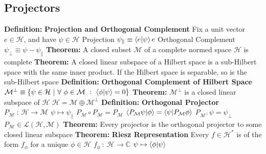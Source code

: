 \documentclass[14pt]{extarticle}
\def\Definition{{\color{blue} \textbf{Definition:} }}
\def\Theorem{{\color{red} \textbf{Theorem:} }}
\begin{document}
\begin{outline}
	\section*{Projectors}
		\1	\Definition \textbf{Projection and Orthogonal Complement}
			\2	Fix a unit vector $e \in \mathcal{H}$, and have $\psi \in \mathcal{H}$
			\2	Projection $\psi_{\parallel} \equiv \braket{e}{\psi}e$
			\2	Orthogonal Complement $\psi_{\bot} \equiv \psi - \psi_{\parallel}$
		\1	\Theorem A closed subset $\mathcal{M}$ of a complete normed space $\mathcal{H}$ is
				complete
		\1	\Theorem A closed linear subspace of a Hilbert space is a sub-Hilbert space
				with the same inner product.  If the Hilbert space is separable, so is 
				the sub-Hilbert space
		\1	\Definition \textbf{Orthogonal Complement of Hilbert Space}
			\2	$\mathcal{M}^{\bot} \equiv \{\psi \in \mathcal{H}~|~\forall~\phi \in \mathcal{M}~:~
						\braket{\phi}{\psi} = 0\}$
		\1	\Theorem $\mathcal{M}^{\bot}$ is a closed linear subspace of $\mathcal{H}$
			\2	$\mathcal{H} = \mathcal{M} \oplus \mathcal{M}^{\bot}$
		\1	\Definition \textbf{Orthogonal Projector}
			\2	$P_{\mathcal{M}}~:~\mathcal{H} \rightarrow \mathcal{M}$
			\2	$\psi \mapsto \psi_{\parallel}$
			\2	$P_{\mathcal{M}} \circ P_{\mathcal{M}} = P_{\mathcal{M}}$
			\2	$\braket{P_{\mathcal{M}}\psi}{\phi} = \braket{\psi}{P_{\mathcal{M}}\phi}$
			\2	$P_{\mathcal{M}^{\bot}} \psi = \psi_{\bot}$
			\2	$P_{\mathcal{M}} \in \mathcal{L}(\mathcal{H},\mathcal{M})$
		\1	\Theorem Every projector is the orthogonal projector to some closed
				linear subspace
		\1	\Theorem \textbf{Riesz Representation}
			\2	Every $f \in \mathcal{H}^*$ is of the form $f_{\phi}$ for a unique
					$\phi \in \mathcal{H}$
				\3	$f_{\phi}~:~\mathcal{H} \rightarrow \mathbb{C}$
				\3	$\psi \mapsto \braket{\phi}{\psi}$
	

\end{outline}
\end{document}
